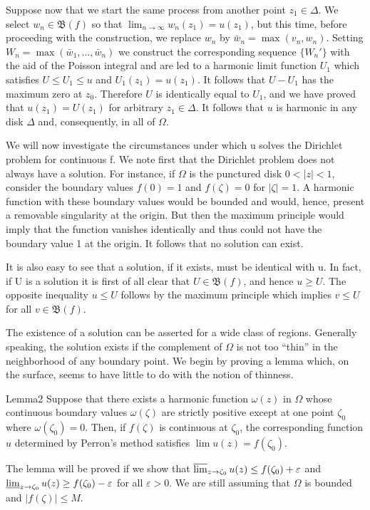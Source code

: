 Suppose now that we start the same process from another point $z_1 \in \Delta$. We select $w_n \in \mathfrak{B}(f)$ so that $\lim_{n \to \infty} w_n(z_1) = u(z_1)$, but this time, before proceeding with the construction, we replace $w_n$ by $\bar{w}_n = \max (v_n, w_n)$. Setting $W_n = \max (\bar{w}_1, \ldots, \bar{w}_n)$ we construct the corresponding sequence $\{W_n'\}$ with the aid of the Poisson integral and are led to a harmonic limit function $U_1$ which satisfies $U \leq U_1 \leq u$ and $U_1(z_1) = u(z_1)$. It follows that $U - U_1$ has the maximum zero at $z_0$. Therefore $U$ is identically equal to $U_1$, and we have proved that $u(z_1) = U(z_1)$ for arbitrary $z_1 \in \Delta$. It follows that $u$ is harmonic in any disk $\Delta$ and, consequently, in all of $\Omega$.

We will now investigate the circumstances under which u solves the Dirichlet problem for continuous f. We note first that the Dirichlet problem does not always have a solution. For instance, if $\Omega$ is the punctured disk $0 < |z| < 1$, consider the boundary values $f(0) = 1$ and $f(\zeta) = 0$ for $|\zeta| = 1$. A harmonic function with these boundary values would be bounded and would, hence, present a removable singularity at the origin. But then the maximum principle would imply that the function vanishes identically and thus could not have the boundary value 1 at the origin. It follows that no solution can exist.

It is also easy to see that a solution, if it exists, must be identical with u. In fact, if U is a solution it is first of all clear that $U \in \mathfrak{B}(f)$, and hence $u \geq U$. The opposite inequality $u \leq U$ follows by the maximum principle which implies $v \leq U$ for all $v \in \mathfrak{B}(f)$.


The existence of a solution can be asserted for a wide class of regions. Generally speaking, the solution exists if the complement of $\Omega$ is not too “thin” in the neighborhood of any boundary point. We begin by proving a lemma which, on the surface, seems to have little to do with the notion of thinness.

\begin{originalstatement}{Lemma}{2}\label{lem:6.2}
Suppose that there exists a harmonic function $\omega(z)$ in $\Omega$ whose continuous boundary values $\omega(\zeta)$ are strictly positive except at one point $\zeta_0$ where $\omega(\zeta_0) = 0$. Then, if $f(\zeta)$ is continuous at $\zeta_0$, the corresponding function $u$ determined by Perron's method satisfies $\lim u(z) = f(\zeta_0)$.
\end{originalstatement}
The lemma will be proved if we show that $\varlimsup_{z\to \zeta_0}u(z)\leq f(\zeta_0) + \varepsilon$ and $\varliminf_{z\to \zeta_0}u(z)\geq f(\zeta_0) - \varepsilon$ for all $\varepsilon >0$. We are still assuming that $\Omega$ is bounded and $|f(\zeta)|\leq M$.

